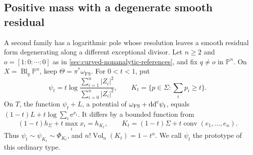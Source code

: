 \subsection{Positive mass with a degenerate smooth residual}
\label{sec:degenerate-projective-residuals}

A second family has a logarithmic pole whose resolution leaves a smooth residual form degenerating along a different exceptional divisor. Let $n\geq2$ and $o=[1:0:\cdots:0]$ as in \cref{sec:curved-nonanalytic-references}, and fix $q\ne o$ in $\mathbb P^n$. On $X=\operatorname{Bl}_q\mathbb P^n$, keep $\Theta=\pi^*\omega_{\mathrm{FS}}$. For $0<t<1$, put
\[
 \psi_t=t\log\frac{\sum_{i=1}^n|Z_i|^2}{\sum_{i=0}^n|Z_i|^2},
 \qquad K_t=\{p\in\Sigma:\textstyle\sum_i p_i\geq t\}.
\]
On $T$, the function $\psi_t+L$, a potential of $\omega_{\mathrm{FS}}+\mathrm{dd}^{\mathrm{c}}\psi_t$, equals $(1-t)L+t\log\sum_i\mathrm{e}^{x_i}$. It differs by a bounded function from
\[
 (1-t)h_\Sigma+t\max_i x_i=h_{K_t},\qquad
 K_t=(1-t)\Sigma+t\operatorname{conv}(e_1,\ldots,e_n).
\]
Thus $\psi_t\sim\psi_{K_t}\sim\Phi_{K_t}$, and $n!\operatorname{Vol}_n(K_t)=1-t^n$. We call $\psi_t$ the prototype of this ordinary type.

